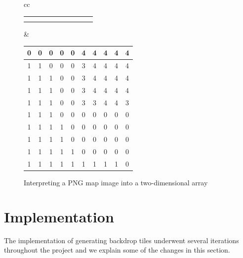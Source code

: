 \begin{figure}[H]
\begin{tabular}{cc}
{\begin{tabular}{|c|c|c|c|c|c|c|c|c|c|}
                \cellcolor{black} & \cellcolor{black} & \cellcolor{black} &
                \cellcolor{black} \\ \hline
                \cellcolor{green} & \cellcolor{green} & \cellcolor{green} &
                \cellcolor{green} & \cellcolor{green} & \cellcolor{black} &
                \cellcolor{black} & \cellcolor{black} & \cellcolor{black} &
                \cellcolor{black} \\ \hline
                \cellcolor{green} & \cellcolor{green} & \cellcolor{green} &
                \cellcolor{green} & \cellcolor{green} & \cellcolor{green} &
                \cellcolor{green} & \cellcolor{green} & \cellcolor{green} &
                \cellcolor{black} \\ \hline
            \end{tabular}
        }
        &
        {\footnotesize
            \setlength{\tabcolsep}{2.5pt}
            \begin{tabular}{|c|c|c|c|c|c|c|c|c|c|}
                \hline
                0 & 0 & 0 & 0 & 0 & 4 & 4 & 4 & 4 & 4 \\ \hline
                1 & 1 & 0 & 0 & 0 & 3 & 4 & 4 & 4 & 4 \\ \hline
                1 & 1 & 1 & 0 & 0 & 3 & 4 & 4 & 4 & 4 \\ \hline
                1 & 1 & 1 & 0 & 0 & 3 & 4 & 4 & 4 & 4 \\ \hline
                1 & 1 & 1 & 0 & 0 & 3 & 3 & 4 & 4 & 3 \\ \hline
                1 & 1 & 1 & 0 & 0 & 0 & 0 & 0 & 0 & 0 \\ \hline
                1 & 1 & 1 & 1 & 0 & 0 & 0 & 0 & 0 & 0 \\ \hline
                1 & 1 & 1 & 1 & 0 & 0 & 0 & 0 & 0 & 0 \\ \hline
                1 & 1 & 1 & 1 & 1 & 0 & 0 & 0 & 0 & 0 \\ \hline
                1 & 1 & 1 & 1 & 1 & 1 & 1 & 1 & 1 & 0 \\ \hline
            \end{tabular}
        }
    \end{tabular}
    \caption{Interpreting a PNG map image into a two-dimensional array}\label{fig:png_to_array} 
\end{figure}

\section{Implementation}
The implementation of generating backdrop tiles underwent several iterations
throughout the project and we explain some of the changes in this section.


